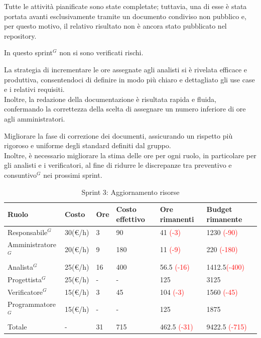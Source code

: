 Tutte le attività pianificate sono state completate; tuttavia, una di esse è stata portata avanti esclusivamente tramite un documento condiviso non pubblico e, per questo motivo, il relativo risultato non è ancora stato pubblicato nel repository.

In questo sprint$^G$ non si sono verificati rischi.

La strategia di incrementare le ore assegnate agli analisti si è rivelata efficace e produttiva, consentendoci di definire in modo più chiaro e dettagliato gli use case e i relativi requisiti.\\
Inoltre, la redazione della documentazione è risultata rapida e fluida, confermando la correttezza della scelta di assegnare un numero inferiore di ore agli amministratori.

Migliorare la fase di correzione dei documenti, assicurando un rispetto più rigoroso e uniforme degli standard definiti dal gruppo.\\
Inoltre, è necessario migliorare la stima delle ore per ogni ruolo, in particolare per gli analisti e i verificatori, al fine di ridurre le discrepanze tra preventivo e consuntivo$^G$ nei prossimi sprint.

\begin{table}[H]
	\centering
	\begin{tabular}{|p{}|p{}|p{}|p{}|p{}|p{}|}
		\hline
		\rowcolor{gray!25}
		Ruolo & Costo & Ore & Costo \newline effettivo & Ore \newline rimanenti & Budget \newline rimanente \\ \hline
		Responsabile$^G$   & 30(€/h) & 3 & 90 & 41 \textcolor{red}{(-3)} & 1230 \textcolor{red}{(-90)} \\ \hline
		Amministratore$^G$ & 20(€/h) & 9 & 180 & 11 \textcolor{red}{(-9)} & 220 \textcolor{red}{(-180)} \\ \hline
		Analista$^G$       & 25(€/h) & 16 & 400 & 56.5 \textcolor{red}{(-16)} & 1412.5\textcolor{red}{(-400)} \\ \hline
		Progettista$^G$    & 25(€/h) & - & - & 125 & 3125 \\ \hline
		Verificatore$^G$   & 15(€/h) & 3 & 45 & 104 \textcolor{red}{(-3)} & 1560 \textcolor{red}{(-45)} \\ \hline
		Programmatore$^G$  & 15(€/h) & - & - & 125 & 1875 \\ \hline
		Totale         & - & 31 & 715 & 462.5 \textcolor{red}{(-31)} & 9422.5 \textcolor{red}{(-715)} \\ \hline
	\end{tabular}
	\caption{Sprint 3: Aggiornamento risorse}
\end{table}